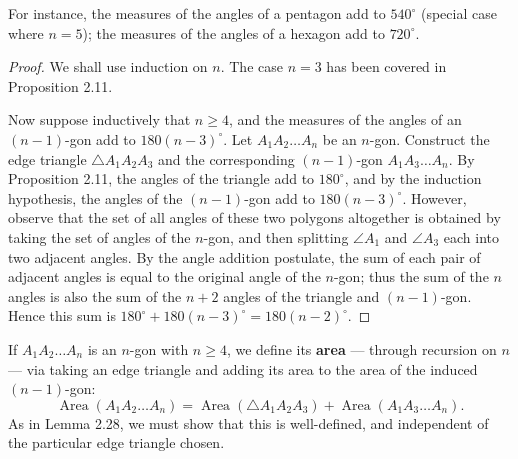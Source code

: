 \documentclass[leqno]{book}
\begin{document}
\noindent For instance, the measures of the angles of a pentagon add to $540^\circ$ (special case where $n=5$); the measures of the angles of a hexagon add to $720^\circ$.
\begin{proof}
We shall use induction on $n$.  The case $n=3$ has been covered in Proposition 2.11.

Now suppose inductively that $n\geqslant 4$, and the measures of the angles of an $(n-1)$-gon add to $180(n-3)^\circ$.  Let $A_1A_2\dots A_n$ be an $n$-gon.  Construct the edge triangle $\triangle A_1A_2A_3$ and the corresponding $(n-1)$-gon $A_1A_3\dots A_n$.  By Proposition 2.11, the angles of the triangle add to $180^\circ$, and by the induction hypothesis, the angles of the $(n-1)$-gon add to $180(n-3)^\circ$.  However, observe that the set of all angles of these two polygons altogether is obtained by taking the set of angles of the $n$-gon, and then splitting $\angle A_1$ and $\angle A_3$ each into two adjacent angles.  By the angle addition postulate, the sum of each pair of adjacent angles is equal to the original angle of the $n$-gon; thus the sum of the $n$ angles is also the sum of the $n+2$ angles of the triangle and $(n-1)$-gon.  Hence this sum is $180^\circ+180(n-3)^\circ=180(n-2)^\circ$.
\end{proof}

\noindent If $A_1A_2\dots A_n$ is an $n$-gon with $n\geqslant 4$, we define its \textbf{area} \---- through recursion on $n$ \---- via taking an edge triangle and adding its area to the area of the induced $(n-1)$-gon:
$$\operatorname{Area}(A_1A_2\dots A_n)=\operatorname{Area}(\triangle A_1A_2A_3)+\operatorname{Area}(A_1A_3\dots A_n).$$
As in Lemma 2.28, we must show that this is well-defined, and independent of the particular edge triangle chosen.\\
\end{document}
